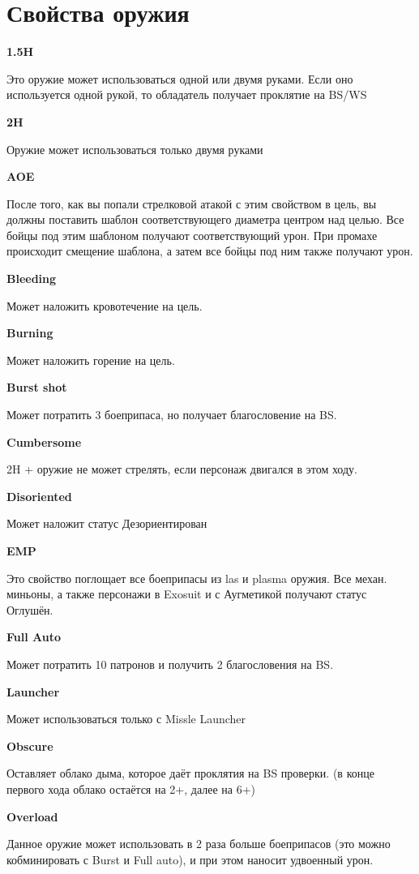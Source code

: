     \section*{Свойства оружия}
    \begin{multicols}{2}
\textbf{1.5H}

Это оружие может использоваться одной или двумя руками. Если оно используется одной рукой, то обладатель получает проклятие на BS/WS

\textbf{2H}

Оружие может использоваться только двумя руками

\textbf{AOE}

После того, как вы попали стрелковой атакой с этим свойством в цель, вы должны поставить шаблон соответствующего диаметра центром над целью.
Все бойцы под этим шаблоном получают соответствующий урон. При промахе происходит смещение шаблона, а затем все бойцы под ним также получают урон. 

\textbf{Bleeding}

Может наложить кровотечение на цель.

\textbf{Burning}

Может наложить горение на цель.

\textbf{Burst shot}

Может потратить 3 боеприпаса, но получает благословение на BS.

\textbf{Cumbersome}

2H + оружие не может стрелять, если персонаж двигался в этом ходу.

\textbf{Disoriented}

Может наложит статус Дезориентирован

\textbf{EMP}

Это свойство поглощает все боеприпасы из las и plasma оружия. Все механ. миньоны, а также персонажи в Exosuit и с Аугметикой получают статус Оглушён.

\textbf{Full Auto}

Может потратить 10 патронов и получить 2 благословения на BS.

\textbf{Launcher}

Может использоваться только с Missle Launcher

\textbf{Obscure}

Оставляет облако дыма, которое даёт проклятия на BS проверки. (в конце первого хода облако остаётся на 2+, далее на 6+)

\textbf{Overload}

Данное оружие может использовать в 2 раза больше боеприпасов (это можно кобминировать с Burst и Full auto), и при этом наносит удвоенный урон.


\end{multicols}
